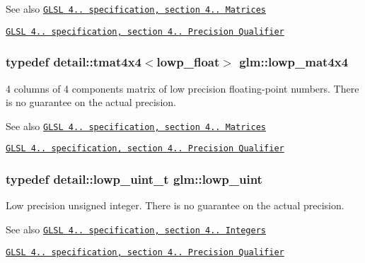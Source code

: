\begin{DoxySeeAlso}{See also}
\href{http://www.opengl.org/registry/doc/GLSLangSpec.4.20.8.pdf}{\tt G\+L\+S\+L 4.. specification, section 4.. Matrices} 

\href{http://www.opengl.org/registry/doc/GLSLangSpec.4.20.8.pdf}{\tt G\+L\+S\+L 4.. specification, section 4.. Precision Qualifier} 
\end{DoxySeeAlso}
\hypertarget{group__core__precision_gad3ab398e7b5115c5dcdbd497dea08664}{}
\subsubsection[{lowp\+\_\+mat4x4}]{\setlength{\rightskip}{0pt plus 5cm}typedef detail\+::tmat4x4$<$lowp\+\_\+float$>$ {\bf glm\+::lowp\+\_\+mat4x4}}\label{group__core__precision_gad3ab398e7b5115c5dcdbd497dea08664}
4 columns of 4 components matrix of low precision floating-\/point numbers. There is no guarantee on the actual precision.

\begin{DoxySeeAlso}{See also}
\href{http://www.opengl.org/registry/doc/GLSLangSpec.4.20.8.pdf}{\tt G\+L\+S\+L 4.. specification, section 4.. Matrices} 

\href{http://www.opengl.org/registry/doc/GLSLangSpec.4.20.8.pdf}{\tt G\+L\+S\+L 4.. specification, section 4.. Precision Qualifier} 
\end{DoxySeeAlso}
\hypertarget{group__core__precision_ga8077c90f2c87e419ea6c273157dcc1fc}{}
\subsubsection[{lowp\+\_\+uint}]{\setlength{\rightskip}{0pt plus 5cm}typedef detail\+::lowp\+\_\+uint\+\_\+t {\bf glm\+::lowp\+\_\+uint}}\label{group__core__precision_ga8077c90f2c87e419ea6c273157dcc1fc}
Low precision unsigned integer. There is no guarantee on the actual precision.

\begin{DoxySeeAlso}{See also}
\href{http://www.opengl.org/registry/doc/GLSLangSpec.4.20.8.pdf}{\tt G\+L\+S\+L 4.. specification, section 4.. Integers} 

\href{http://www.opengl.org/registry/doc/GLSLangSpec.4.20.8.pdf}{\tt G\+L\+S\+L 4.. specification, section 4.. Precision Qualifier} 
\end{DoxySeeAlso}
\hypertarget{group__core__precision_gacae56e02818d0da34e70ac934807388c}{}

